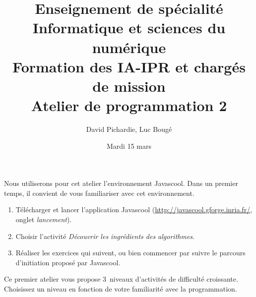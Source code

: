 \documentclass[a4paper,11pt]{article}
\begin{document}
\title{Enseignement de spécialité\\
Informatique et sciences du numérique\\
Formation des IA-IPR et chargés de mission\\
Atelier de programmation 2}

\date{Mardi 15 mars}

\author{David Pichardie, Luc Bougé}

\maketitle

Nous utiliserons pour cet atelier l'environnement Javascool. Dans un
premier temps, il convient de vous familiariser avec cet
environnement.
\begin{enumerate}
\item Télécharger et lancer l'application Javascool
  (\url{http://javascool.gforge.inria.fr/}, onglet \emph{lancement}).
\item Choisir l'activité \emph{Découvrir les ingrédients des algorithmes}.
\item Réaliser les exercices qui suivent, ou bien commencer par suivre le parcours d'initiation proposé par Javascool.
\end{enumerate}
Ce premier atelier vous propose 3~niveaux d'activités de difficulté croissante. Choisissez un niveau
en fonction de votre familiarité avec la programmation.
\end{document}
